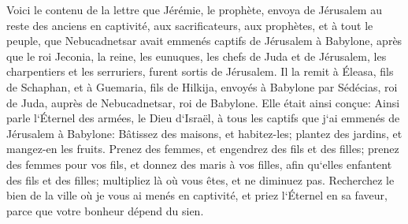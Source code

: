 \verse Voici le contenu de la lettre que Jérémie, le prophète, envoya de Jérusalem au reste des anciens en captivité, aux sacrificateurs, aux prophètes, et à tout le peuple, que Nebucadnetsar avait emmenés captifs de Jérusalem à Babylone, 
\verse après que le roi Jeconia, la reine, les eunuques, les chefs de Juda et de Jérusalem, les charpentiers et les serruriers, furent sortis de Jérusalem. 
\verse Il la remit à Éleasa, fils de Schaphan, et à Guemaria, fils de Hilkija, envoyés à Babylone par Sédécias, roi de Juda, auprès de Nebucadnetsar, roi de Babylone. Elle était ainsi conçue: 
\verse Ainsi parle l`Éternel des armées, le Dieu d`Israël, à tous les captifs que j`ai emmenés de Jérusalem à Babylone: 
\verse Bâtissez des maisons, et habitez-les; plantez des jardins, et mangez-en les fruits. 
\verse Prenez des femmes, et engendrez des fils et des filles; prenez des femmes pour vos fils, et donnez des maris à vos filles, afin qu`elles enfantent des fils et des filles; multipliez là où vous êtes, et ne diminuez pas. 
\verse Recherchez le bien de la ville où je vous ai menés en captivité, et priez l`Éternel en sa faveur, parce que votre bonheur dépend du sien. 
